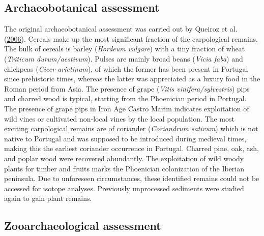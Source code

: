 \documentclass[preprint, 3p, authoryear]{elsarticle} %
\begin{document}
\hypertarget{archaeobotanical-assessment}{%
\subsection{Archaeobotanical assessment}\label{archaeobotanical-assessment}}

The original archaeobotanical assessment was carried out by Queiroz et al. (\protect\hyperlink{ref-queiroz_etal06}{2006}). Cereals make up the most significant fraction of the carpological remains. The bulk of cereals is barley (\emph{Hordeum vulgare}) with a tiny fraction of wheat (\emph{Triticum durum/aestivum}). Pulses are mainly broad beans (\emph{Vicia faba}) and chickpeas (\emph{Cicer arietinum}), of which the former has been present in Portugal since prehistoric times, whereas the latter was appreciated as a luxury food in the Roman period from Asia. The presence of grape (\emph{Vitis vinifera/sylvestris}) pips and charred wood is typical, starting from the Phoenician period in Portugal. The presence of grape pips in Iron Age Castro Marim indicates exploitation of wild vines or cultivated non-local vines by the local population. The most exciting carpological remains are of coriander (\emph{Coriandrum sativum}) which is not native to Portugal and was supposed to be introduced during medieval times, making this the earliest coriander occurrence in Portugal. Charred pine, oak, ash, and poplar wood were recovered abundantly. The exploitation of wild woody plants for timber and fruits marks the Phoenician colonization of the Iberian peninsula. Due to unforeseen circumstances, these identified remains could not be accessed for isotope analyses. Previously unprocessed sediments were studied again to gain plant remains.

\hypertarget{zooarchaeological-assessment}{%
\subsection{Zooarchaeological assessment}\label{zooarchaeological-assessment}}
\end{document}

